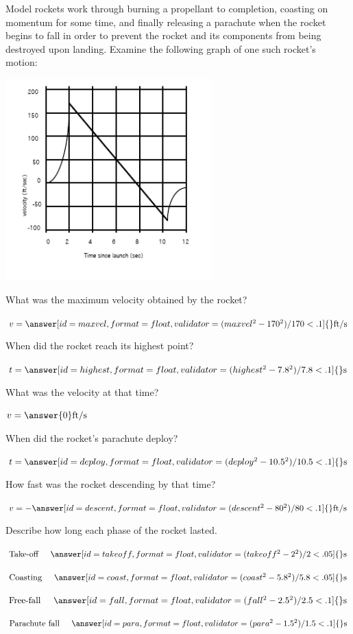 \documentclass{ximera}
\begin{document}
\begin{question}
Model rockets work through burning a propellant to completion, coasting on momentum for some time, and finally releasing a parachute when the rocket begins to fall in order to prevent the rocket and its components from being destroyed upon landing. Examine the following graph of one such rocket's motion:
\begin{image}
    \includegraphics[width=80mm]{rocket.png}
\end{image}

What was the maximum velocity obtained by the rocket?

$v = \answer[id=maxvel,format=float,validator=(maxvel^2-170^2)/170 < .1]{} \text{ft} / \text{s}$

When did the rocket reach its highest point?

$t = \answer[id=highest,format=float,validator=(highest^2-7.8^2)/7.8 < .1]{} \text{s}$

What was the velocity at that time?

$v = \answer{0} \text{ft} / \text{s}$

When did the rocket's parachute deploy?

$t = \answer[id=deploy,format=float,validator=(deploy^2-10.5^2)/10.5 < .1]{} \text{s}$

How fast was the rocket descending by that time?

$v = -\answer[id=descent,format=float,validator=(descent^2-80^2)/80 < .1]{} \text{ft} / \text{s}$

Describe how long each phase of the rocket lasted.

$\text{Take-off} \hspace{5mm} \answer[id=takeoff,format=float,validator=(takeoff^2-2^2)/2 < .05]{} \text{s}$

$\text{Coasting} \hspace{5mm} \answer[id=coast,format=float,validator=(coast^2-5.8^2)/5.8 < .05]{} \text{s}$

$\text{Free-fall} \hspace{5mm} \answer[id=fall,format=float,validator=(fall^2-2.5^2)/2.5 < .1]{} \text{s}$

$\text{Parachute fall} \hspace{5mm} \answer[id=para,format=float,validator=(para^2-1.5^2)/1.5 < .1]{} \text{s}$
\end{question}
\end{document}
